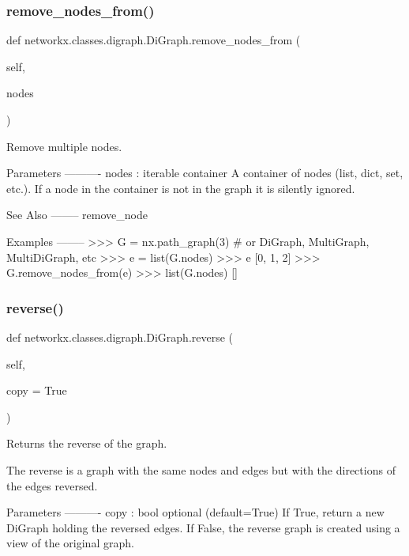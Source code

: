 \subsubsection{\texorpdfstring{remove\+\_\+nodes\+\_\+from()}{remove\_nodes\_from()}}
{\footnotesize\ttfamily def networkx.\+classes.\+digraph.\+Di\+Graph.\+remove\+\_\+nodes\+\_\+from (\begin{DoxyParamCaption}\item[{}]{self,  }\item[{}]{nodes }\end{DoxyParamCaption})}

\begin{DoxyVerb}Remove multiple nodes.

Parameters
----------
nodes : iterable container
    A container of nodes (list, dict, set, etc.).  If a node
    in the container is not in the graph it is silently ignored.

See Also
--------
remove_node

Examples
--------
>>> G = nx.path_graph(3)  # or DiGraph, MultiGraph, MultiDiGraph, etc
>>> e = list(G.nodes)
>>> e
[0, 1, 2]
>>> G.remove_nodes_from(e)
>>> list(G.nodes)
[]\end{DoxyVerb}
 \mbox{\label{classnetworkx_1_1classes_1_1digraph_1_1DiGraph_a48947d2a848049194da0bdab4ae0f972}} 
\subsubsection{\texorpdfstring{reverse()}{reverse()}}
{\footnotesize\ttfamily def networkx.\+classes.\+digraph.\+Di\+Graph.\+reverse (\begin{DoxyParamCaption}\item[{}]{self,  }\item[{}]{copy = {\ttfamily True} }\end{DoxyParamCaption})}

\begin{DoxyVerb}Returns the reverse of the graph.

The reverse is a graph with the same nodes and edges
but with the directions of the edges reversed.

Parameters
----------
copy : bool optional (default=True)
    If True, return a new DiGraph holding the reversed edges.
    If False, the reverse graph is created using a view of
    the original graph.
\end{DoxyVerb}
 \mbox{\label{classnetworkx_1_1classes_1_1digraph_1_1DiGraph_aa222645f98f3e9743907061e2e9bc804}} 
